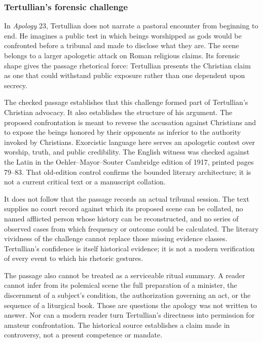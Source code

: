\subsubsection{Tertullian's forensic challenge}

In \emph{Apology} 23, Tertullian does not narrate a pastoral encounter from
beginning to end. He imagines a public test in which beings worshipped as gods
would be confronted before a tribunal and made to disclose what they are. The
scene belongs to a larger apologetic attack on Roman religious claims. Its
forensic shape gives the passage rhetorical force: Tertullian presents the
Christian claim as one that could withstand public exposure rather than one
dependent upon secrecy.

The checked passage establishes that this challenge formed part of
Tertullian's Christian advocacy. It also establishes the structure of his
argument. The proposed confrontation is meant to reverse the accusation
against Christians and to expose the beings honored by their opponents as
inferior to the authority invoked by Christians. Exorcistic language here
serves an apologetic contest over worship, truth, and public credibility.
The English witness was checked against the Latin in the
Oehler--Mayor--Souter Cambridge edition of 1917, printed pages 79--83. That
old-edition control confirms the bounded literary architecture; it is not a
current critical text or a manuscript collation.

It does not follow that the passage records an actual tribunal session. The
text supplies no court record against which its proposed scene can be
collated, no named afflicted person whose history can be reconstructed, and no
series of observed cases from which frequency or outcome could be calculated.
The literary vividness of the challenge cannot replace those missing evidence
classes. Tertullian's confidence is itself historical evidence; it is not a
modern verification of every event to which his rhetoric gestures.

The passage also cannot be treated as a serviceable ritual summary. A reader
cannot infer from its polemical scene the full preparation of a minister, the
discernment of a subject's condition, the authorization governing an act, or
the sequence of a liturgical book. Those are questions the apology was not
written to answer. Nor can a modern reader turn Tertullian's directness into
permission for amateur confrontation. The historical source establishes a
claim made in controversy, not a present competence or mandate.

